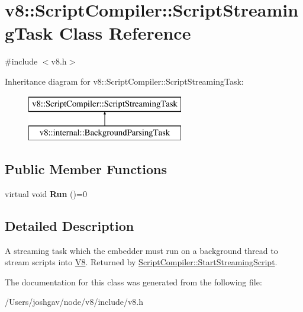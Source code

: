 \hypertarget{classv8_1_1_script_compiler_1_1_script_streaming_task}{}\section{v8\+:\+:Script\+Compiler\+:\+:Script\+Streaming\+Task Class Reference}
\label{classv8_1_1_script_compiler_1_1_script_streaming_task}


{\ttfamily \#include $<$v8.\+h$>$}

Inheritance diagram for v8\+:\+:Script\+Compiler\+:\+:Script\+Streaming\+Task\+:\begin{figure}[H]
\begin{center}
\leavevmode
\includegraphics[height=2.000000cm]{classv8_1_1_script_compiler_1_1_script_streaming_task}
\end{center}
\end{figure}
\subsection*{Public Member Functions}
\begin{DoxyCompactItemize}
\item 
virtual void {\bfseries Run} ()=0\hypertarget{classv8_1_1_script_compiler_1_1_script_streaming_task_a8eb7a750cbd26ee62c70067c0408c3e1}{}\label{classv8_1_1_script_compiler_1_1_script_streaming_task_a8eb7a750cbd26ee62c70067c0408c3e1}

\end{DoxyCompactItemize}


\subsection{Detailed Description}
A streaming task which the embedder must run on a background thread to stream scripts into \hyperlink{classv8_1_1_v8}{V8}. Returned by \hyperlink{classv8_1_1_script_compiler_a556e64fe39f5bcafd9f4c04957776f60}{Script\+Compiler\+::\+Start\+Streaming\+Script}. 

The documentation for this class was generated from the following file\+:\begin{DoxyCompactItemize}
\item 
/\+Users/joshgav/node/v8/include/v8.\+h\end{DoxyCompactItemize}
